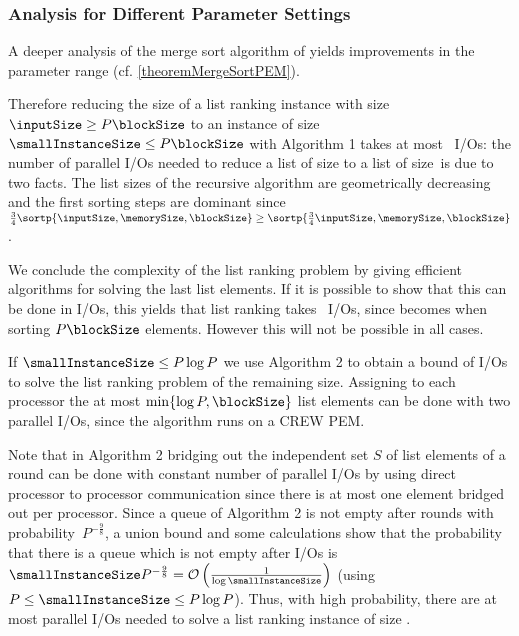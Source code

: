 \documentclass[envcountsame]{llncs}
\def\bO#1{\printmath{\mathcal{O}\left(#1\right)}}
\begin{document}
\subsubsection{Analysis for Different Parameter Settings}

A deeper analysis of the merge sort algorithm of \cite{2008ArgeEtAlFundamentalPEM} yields improvements in the parameter range (cf. \autoref{theoremMergeSortPEM}).



Therefore reducing the size of a list ranking instance with size $\inputSize \geq P\blockSize$ to an instance of size~$\smallInstanceSize \leq P\blockSize$ with Algorithm 1 takes at most ~I/Os: 
the number of parallel I/Os needed to reduce a list of size  to a list of size~\smallInstanceSize is \bO{\sortp{\inputSize,\memorySize,\blockSize}} due to two facts.
The list sizes of the recursive algorithm are geometrically decreasing and the first sorting steps are dominant since $\frac{3}{4}\sortp{\inputSize,\memorySize,\blockSize} \geq \sortp{\frac{3}{4}\inputSize,\memorySize,\blockSize}$ \cite{1995ChiangExternalMemoryGraphAlgorithms,2010ArgeEtAlGraphAlgoPEM}. 

We conclude the complexity of the list ranking problem by giving efficient algorithms for solving the last \smallInstanceSize list elements. 
If it is possible to show that this can be done in \bO{\log P} I/Os, this yields that list ranking takes ~I/Os, since  becomes \bO{\log P} when sorting $P\blockSize$ elements.
However this will not be possible in all cases.

If $\smallInstanceSize\leq P\log P$ we use Algorithm 2 to obtain a bound of \bO{\log P} I/Os to solve the list ranking problem of the remaining size. 
Assigning to each processor the at most $\min\{\log P,\blockSize\}$ list elements can be done with two parallel I/Os, since the algorithm runs on a CREW PEM.


Note that in Algorithm 2 bridging out the independent set $S$ of list elements of a round can be done with constant number of parallel I/Os by using direct processor to processor communication since there is at most one element bridged out per processor.
Since a queue of Algorithm 2 is not empty after \bO{\log P} rounds with probability~$P^{-\frac{9}{8}}$, a union bound and some calculations show that the probability that there is a queue which is not empty after \bO{\log P} I/Os is~$\smallInstanceSize P^{-\frac{9}{8}} = \bO{\frac{1}{\log \smallInstanceSize}}$ (using $P\leq \smallInstanceSize \leq P\log P$).
Thus, with high probability, there are at most \bO{\log(P)} parallel I/Os needed to solve a list ranking instance of size \smallInstanceSize.
\end{document}
